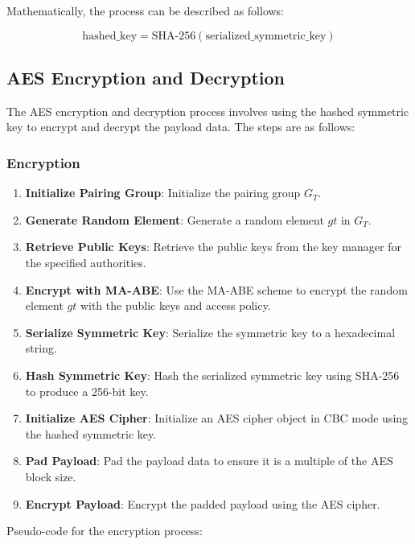Mathematically, the process can be described as follows:

\begin{equation}
\text{hashed\_key} = \text{SHA-256}(\text{serialized\_symmetric\_key})
\end{equation}
\subsection{AES Encryption and Decryption}

The AES encryption and decryption process involves using the hashed symmetric key to encrypt and decrypt the payload data. The steps are as follows:

\subsubsection{Encryption}

\begin{enumerate}
  \item \textbf{Initialize Pairing Group}: Initialize the pairing group \(G_T\).
  \item \textbf{Generate Random Element}: Generate a random element \(gt\) in \(G_T\).
  \item \textbf{Retrieve Public Keys}: Retrieve the public keys from the key manager for the specified authorities.
  \item \textbf{Encrypt with MA-ABE}: Use the MA-ABE scheme to encrypt the random element \(gt\) with the public keys and access policy.
  \item \textbf{Serialize Symmetric Key}: Serialize the symmetric key to a hexadecimal string.
  \item \textbf{Hash Symmetric Key}: Hash the serialized symmetric key using SHA-256 to produce a 256-bit key.
  \item \textbf{Initialize AES Cipher}: Initialize an AES cipher object in CBC mode using the hashed symmetric key.
  \item \textbf{Pad Payload}: Pad the payload data to ensure it is a multiple of the AES block size.
  \item \textbf{Encrypt Payload}: Encrypt the padded payload using the AES cipher.
\end{enumerate}

Pseudo-code for the encryption process:

